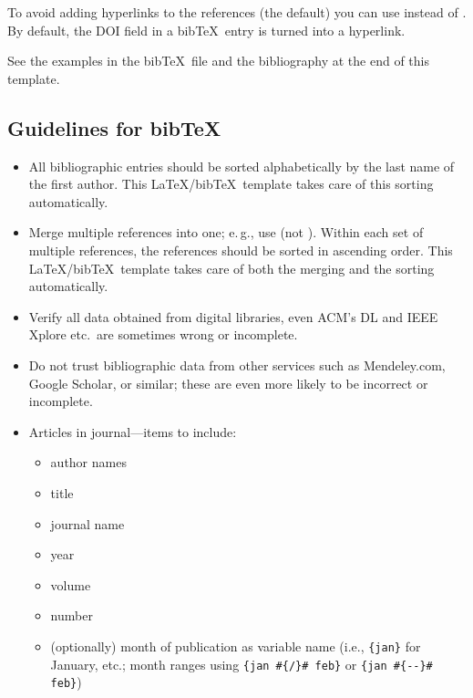 \documentclass[journal]{vgtc}                     %
\begin{document}
To avoid adding hyperlinks to the references (the default) you can use \verb|| instead of \verb||.
By default, the DOI field in a bib\TeX\ entry is turned into a hyperlink.

See the examples in the bib\TeX\ file and the bibliography at the end of this template.

\subsection{Guidelines for bibTeX}

\begin{itemize}
  \item All bibliographic entries should be sorted alphabetically by the last name of the first author.
        This \LaTeX/bib\TeX\ template takes care of this sorting automatically.
  \item Merge multiple references into one; e.\,g., use \cite{Max1995OpticalModelsDirect,Kitware2003VisualizationToolkitUsers} (not \cite{Kitware2003VisualizationToolkitUsers}\cite{Max1995OpticalModelsDirect}).
        Within each set of multiple references, the references should be sorted in ascending order.
        This \LaTeX/bib\TeX\ template takes care of both the merging and the sorting automatically.
  \item Verify all data obtained from digital libraries, even ACM's DL and IEEE Xplore  etc.\ are sometimes wrong or incomplete.
  \item Do not trust bibliographic data from other services such as Mendeley.com, Google Scholar, or similar; these are even more likely to be incorrect or incomplete.
  \item Articles in journal---items to include:
        \begin{itemize}
  	      \item author names
  	      \item title
  	      \item journal name
  	      \item year
  	      \item volume
  	      \item number
  	      \item (optionally) month of publication as variable name (i.e., \texttt{\{jan\}} for January, etc.; month ranges using \texttt{\{jan \#\{/\}\# feb\}} or \texttt{\{jan \#\{-{}-\}\# feb\}})
        \end{itemize}

\end{itemize}
\end{document}
